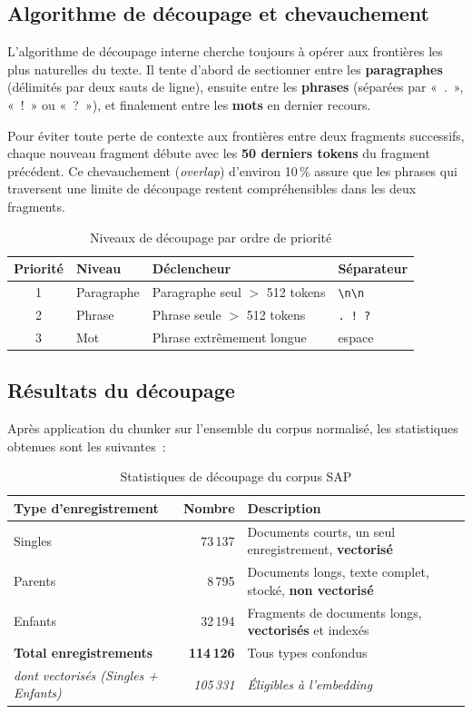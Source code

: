 \subsection{Algorithme de découpage et chevauchement}

L'algorithme de découpage interne cherche toujours à opérer aux frontières les plus naturelles du texte. Il tente d'abord de sectionner entre les \textbf{paragraphes} (délimités par deux sauts de ligne), ensuite entre les \textbf{phrases} (séparées par «~.~», «~!~» ou «~?~»), et finalement entre les \textbf{mots} en dernier recours.

Pour éviter toute perte de contexte aux frontières entre deux fragments successifs, chaque nouveau fragment débute avec les \textbf{50 derniers tokens} du fragment précédent. Ce chevauchement (\textit{overlap}) d'environ 10\,\% assure que les phrases qui traversent une limite de découpage restent compréhensibles dans les deux fragments.
\begin{table}[H]
\centering
\caption{Niveaux de découpage par ordre de priorité}
\label{tab:niveaux-decoupage}
\begin{tabular}{|c|l|l|l|}
\hline
\textbf{Priorité} & \textbf{Niveau} & \textbf{Déclencheur} & \textbf{Séparateur} \\
\hline
1 & Paragraphe & Paragraphe seul $>$ 512 tokens & \texttt{\textbackslash n\textbackslash n} \\
\hline
2 & Phrase & Phrase seule $>$ 512 tokens & \texttt{. ! ?} \\
\hline
3 & Mot & Phrase extrêmement longue & espace \\
\hline
\end{tabular}
\end{table}

\subsection{Résultats du découpage}

Après application du chunker sur l'ensemble du corpus normalisé, les statistiques obtenues
sont les suivantes~:

\begin{table}[H]
\centering
\caption{Statistiques de découpage du corpus SAP}
\label{tab:stats-chunking}
\begin{tabular}{|l|r|p{6cm}|}
\hline
\textbf{Type d'enregistrement} & \textbf{Nombre} & \textbf{Description} \\
\hline
Singles  & 73\,137 & Documents courts, un seul enregistrement, \textbf{vectorisé} \\
\hline
Parents  & 8\,795  & Documents longs, texte complet, stocké, \textbf{non vectorisé} \\
\hline
Enfants  & 32\,194 & Fragments de documents longs, \textbf{vectorisés} et indexés \\
\hline
\textbf{Total enregistrements} & \textbf{114\,126} & Tous types confondus \\
\hline
\textit{dont vectorisés (Singles + Enfants)} & \textit{105\,331} & \textit{Éligibles à l'embedding} \\
\hline
\end{tabular}
\end{table}

